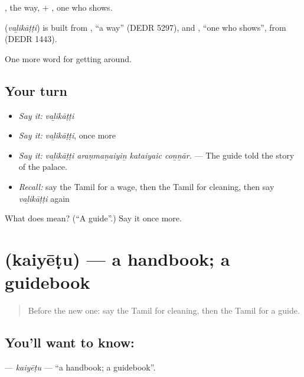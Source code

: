 , the way, + , one who shows.

\begin{cousinweb}
\textbf{} (\emph{vaḻikāṭṭi}) is built from , \textquotedblleft{}a way\textquotedblright{} (DEDR 5297), and , \textquotedblleft{}one who shows\textquotedblright{}, from  (DEDR 1443).
\end{cousinweb}

\begin{grammarlens}[title={What you've built}]
One more word for getting around.
\end{grammarlens}

\subsection*{Your turn}
\begin{itemize}
\raggedright
  \item \emph{Say it:} \emph{vaḻikāṭṭi}
  \item \emph{Say it:} \emph{vaḻikāṭṭi}, once more
  \item \emph{Say it:} \emph{vaḻikāṭṭi araṇmaṉaiyiṉ kataiyaic coṉṉār.} — The guide told the story of the palace.
  \item \emph{Recall:} say the Tamil for a wage, then the Tamil for cleaning, then say \emph{vaḻikāṭṭi} again
\end{itemize}

\begin{tcolorbox}[breakable,colback=teal!4,colframe=teal!35!black,title={Before you move on}]
What does  mean? (\textquotedblleft{}A guide\textquotedblright{}.) Say it once more.
\end{tcolorbox}
\section[\texorpdfstring{\ta{கையேடு} (kaiyēṭu)}{கையேடு (kaiyēṭu)}]{ (kaiyēṭu) — a handbook; a guidebook}

\label{lesson:TA-C421-kaiyetu}



\begin{quote}
Before the new one: say the Tamil for cleaning, then the Tamil for a guide.
\end{quote}

\subsection*{You'll want to know: }
\textbf{} — \emph{kaiyēṭu} — \textquotedblleft{}a handbook; a guidebook\textquotedblright{}.

